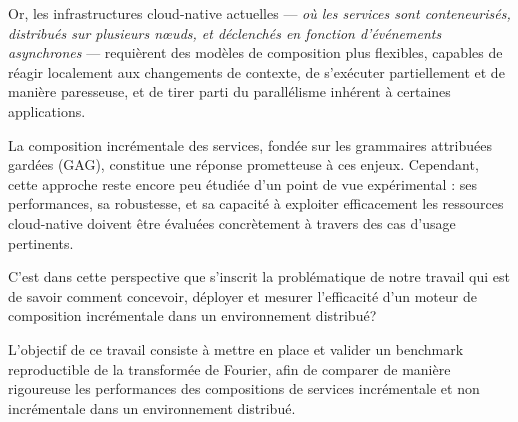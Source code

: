 Or, les infrastructures cloud-native actuelles — \textit{où les services sont conteneurisés, distribués sur plusieurs nœuds, et déclenchés en fonction d’événements asynchrones} — requièrent des modèles de composition plus flexibles, capables de réagir localement aux changements de contexte, de s’exécuter partiellement et de manière paresseuse, et de tirer parti du parallélisme inhérent à certaines applications.

La composition incrémentale des services, fondée sur les grammaires attribuées gardées (GAG), constitue une réponse prometteuse à ces enjeux. Cependant, cette approche reste encore peu étudiée d’un point de vue expérimental : ses performances, sa robustesse, et sa capacité à exploiter efficacement les ressources cloud-native doivent être évaluées concrètement à travers des cas d’usage pertinents.

C’est dans cette perspective que s’inscrit la problématique de notre travail qui est de savoir comment concevoir, déployer et mesurer l’efficacité d’un moteur de composition incrémentale dans un environnement distribué?


  L’objectif de ce travail consiste à mettre en place et valider un benchmark reproductible de la transformée de Fourier, afin de comparer de manière rigoureuse les performances des compositions de services incrémentale et non incrémentale dans un environnement distribué. \\
  
    

